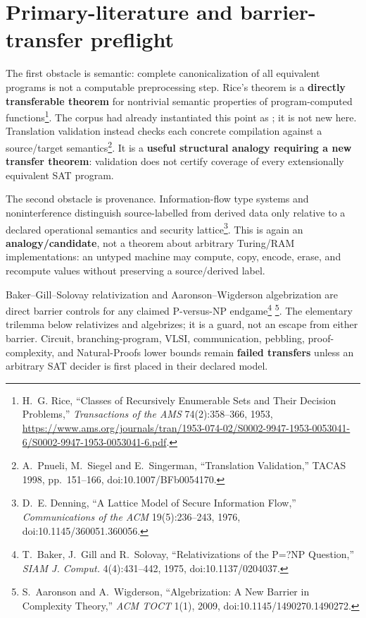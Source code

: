 \documentclass[11pt]{article}
\newcommand{\claim}[1]{\texttt{\detokenize{#1}}}
\begin{document}
\section{Primary-literature and barrier-transfer preflight}

The first obstacle is semantic: complete canonicalization of all equivalent
programs is not a computable preprocessing step.  Rice's theorem is a
\textbf{directly transferable theorem} for nontrivial semantic properties of
program-computed functions\footnote{H.~G. Rice, ``Classes of Recursively
Enumerable Sets and Their Decision Problems,'' \emph{Transactions of the
AMS} 74(2):358--366, 1953,
\url{https://www.ams.org/journals/tran/1953-074-02/S0002-9947-1953-0053041-6/S0002-9947-1953-0053041-6.pdf}.}.
The corpus had already instantiated this point as
\claim{POLY-EXTENSIONAL-CANONIZER-NOGO1}; it is not new here.
Translation validation instead checks each concrete compilation against a
source/target semantics\footnote{A.~Pnueli, M.~Siegel and E.~Singerman,
``Translation Validation,'' TACAS 1998, pp.~151--166,
doi:10.1007/BFb0054170.}.  It is a \textbf{useful structural analogy requiring
a new transfer theorem}: validation does not certify coverage of every
extensionally equivalent SAT program.

The second obstacle is provenance.  Information-flow type systems and
noninterference distinguish source-labelled from derived data only relative
to a declared operational semantics and security lattice\footnote{D.~E.
Denning, ``A Lattice Model of Secure Information Flow,'' \emph{Communications
of the ACM} 19(5):236--243, 1976, doi:10.1145/360051.360056.}.  This is again
an \textbf{analogy/candidate}, not a theorem about arbitrary Turing/RAM
implementations: an untyped machine may compute, copy, encode, erase, and
recompute values without preserving a source/derived label.

Baker--Gill--Solovay relativization and Aaronson--Wigderson algebrization are
direct barrier controls for any claimed P-versus-NP endgame\footnote{T.~Baker,
J.~Gill and R.~Solovay, ``Relativizations of the P=?NP Question,'' \emph{SIAM
J. Comput.} 4(4):431--442, 1975, doi:10.1137/0204037.}
\footnote{S.~Aaronson and A.~Wigderson, ``Algebrization: A New Barrier in
Complexity Theory,'' \emph{ACM TOCT} 1(1), 2009,
doi:10.1145/1490270.1490272.}.  The elementary trilemma below relativizes and
algebrizes; it is a guard, not an escape from either barrier.  Circuit,
branching-program, VLSI, communication, pebbling, proof-complexity, and
Natural-Proofs lower bounds remain \textbf{failed transfers} unless an
arbitrary SAT decider is first placed in their declared model.
\end{document}
